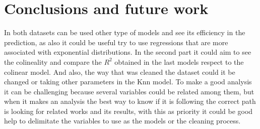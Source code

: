 \documentclass{article}
\begin{document}
\section{Conclusions and future work}
In both datasets can be used other type of models and see its efficiency in the prediction, as also it could be useful try to use regressions that are more associated with exponential distributions. In the second part it could aim to see the colineality and compare the $R^2$ obtained in the last models respect to the colinear model. And also, the way that was cleaned the dataset could it be changed or taking other parameters in the Knn model. 
To make a good analysis it can be challenging because several variables could be related among them, but when it makes an analysis the best way to know if it is following the correct path is looking for related works and its results, with this as priority it could be good help to delimitate the variables to use as the models or the cleaning process.


\end{document}
